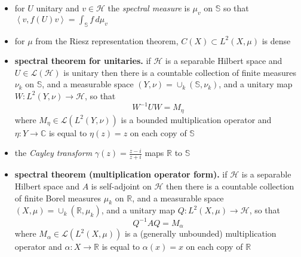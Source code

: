 \documentclass[11pt]{article}
\newcommand{\cH}{\mathcal{H}}
\newcommand{\cL}{\mathcal{L}}
\newcommand{\CC}{\mathbb{C}}
\newcommand{\RR}{\mathbb{R}}
\renewcommand{\SS}{\mathbb{S}}
\newcommand{\ip}[2]{\left<#1,#2\right>}
\newcommand{\ds}{\displaystyle}
\begin{document}
\begin{itemize}[leftmargin=10mm,itemsep=0mm]
\item[\df{105}] for $U$ unitary and $v\in\cH$ the \emph{spectral measure} is $\mu_v$ on $\SS$ so that $\ip{v}{f(U)v} = \int_{\SS} f\,d\mu_v$
\item[\ft{106}] for $\mu$ from the Riesz representation theorem, $C(X) \subset L^2(X,\mu)$ is dense
\item[\ft{107}] \textbf{spectral theorem for unitaries.} if $\cH$ is a separable Hilbert space and $U\in\cL(\cH)$ is unitary then there is a countable collection of finite measures $\nu_k$ on $\SS$, and a measurable space $(Y,\nu) = \cup_k (\SS,\nu_k)$, and a unitary map $W:L^2(Y,\nu) \to \cH$, so that
	$$W^{-1} U W = M_\eta$$
where $M_\eta \in \cL(L^2(Y,\nu))$ is a bounded multiplication operator and $\eta:Y\to \CC$ is equal to $\eta(z)=z$ on each copy of $\SS$
\item[\df{108}] the \emph{Cayley transform} $\ds \gamma(z) = \frac{z-i}{z+i}$ maps $\RR$ to $\SS$
\item[\ft{108}] \textbf{spectral theorem (multiplication operator form).} if $\cH$ is a separable Hilbert space and $A$ is self-adjoint on $\cH$ then there is a countable collection of finite Borel measures $\mu_k$ on $\RR$, and a measurable space $(X,\mu) = \cup_k (\RR,\mu_k)$, and a unitary map $Q:L^2(X,\mu) \to \cH$, so that
	$$Q^{-1} A Q = M_\alpha$$
where $M_\alpha \in \cL(L^2(X,\mu))$ is a (generally unbounded) multiplication operator and $\alpha:X\to \RR$ is equal to $\alpha(x)=x$ on each copy of $\RR$
\end{itemize}
\end{document}
